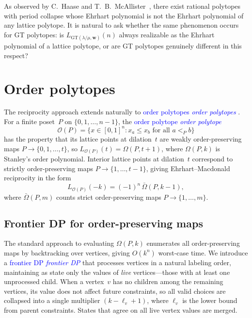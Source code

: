\documentclass[11pt,reqno]{amsart}
\theoremstyle{definition}
\newcommand{\GT}{\mathrm{GT}}
\newcommand{\lam}{\lambda}
\newcommand{\wt}{\mathbf{w}}
\newcommand{\Ehr}{L}
\newcommand{\defin}[1]{%
\relax\ifmmode%
\textcolor{blue}{#1}%
\else \textcolor{blue}{\emph{#1}}%
\fi%
}
\begin{document}
As observed by C.~Haase and T.~B.~McAllister~\cite{HaaseMcAllister2007},
there exist rational polytopes with period collapse whose Ehrhart
polynomial is not the Ehrhart polynomial of any lattice polytope.
It is natural to ask whether the same phenomenon occurs for GT
polytopes: is $\Ehr_{\GT(\lam/\mu, \wt)}(n)$ always realizable as
the Ehrhart polynomial of a lattice polytope, or are GT polytopes
genuinely different in this respect?


\section{Order polytopes}\label{sec:orderPolytopes}

The reciprocity approach extends naturally to \defin{order polytopes}.
For a finite poset~$P$ on $\{0,1,\dotsc,n-1\}$, the
\defin{order polytope}~\cite{Stanley1986}
\[
  \mathcal{O}(P) = \bigl\{x \in [0,1]^n : x_a \leq x_b \text{ for all } a <_P b \bigr\}
\]
has the property that its lattice points at dilation~$t$ are weakly
order-preserving maps $P \to \{0,1,\dotsc,t\}$, so
$\Ehr_{\mathcal{O}(P)}(t) = \Omega(P, t+1)$, where $\Omega(P,k)$
is Stanley's order polynomial.  Interior lattice points at dilation~$t$
correspond to strictly order-preserving maps $P \to \{1,\dotsc,t-1\}$,
giving Ehrhart--Macdonald reciprocity in the form
\begin{equation}\label{eq:order-reciprocity}
  \Ehr_{\mathcal{O}(P)}(-k)
  = (-1)^n \, \bar{\Omega}(P, k-1),
\end{equation}
where $\bar{\Omega}(P,m)$ counts strict order-preserving maps
$P \to \{1,\dotsc,m\}$.

\subsection{Frontier DP for order-preserving maps}\label{subs:frontierDP}

The standard approach to evaluating $\Omega(P,k)$ enumerates all
order-preserving maps by backtracking over vertices, giving
$O(k^n)$ worst-case time.  We introduce a \defin{frontier DP} that
processes vertices in a natural labeling order, maintaining as state
only the values of \emph{live} vertices---those with at least one
unprocessed child.  When a vertex~$v$ has no children among the
remaining vertices, its value does not affect future constraints,
so all valid choices are collapsed into a single multiplier
$(k - \ell_v + 1)$, where $\ell_v$ is the lower bound from parent
constraints.  States that agree on all live vertex values are merged.
\end{document}
